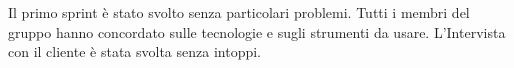 Il primo sprint è stato svolto senza particolari problemi. Tutti i membri del gruppo hanno concordato sulle tecnologie e sugli strumenti da usare. L'Intervista con il cliente è stata svolta senza intoppi.

